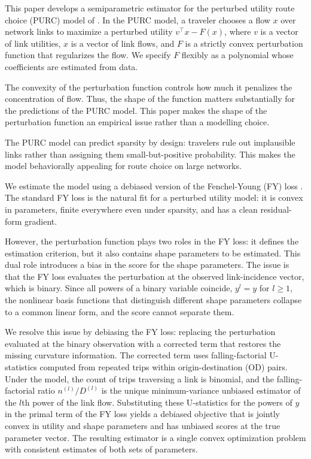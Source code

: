 \documentclass[12pt]{article}
\begin{document}
This paper develops a semiparametric estimator for the perturbed utility route choice (PURC) model of \citet{fosgerau2022perturbed, fosgerau2023bikeability}. In the PURC model, a traveler chooses a flow $x$ over network links to maximize a perturbed utility $v^\top x - F(x)$, where $v$ is a vector of link utilities, $x$ is a vector of link flows, and $F$ is a strictly convex perturbation function that regularizes the flow. We specify $F$ flexibly as a polynomial whose coefficients are estimated from data.

The convexity of the perturbation function controls how much it penalizes the concentration of flow. Thus, the shape of the function matters substantially for the predictions of the PURC model. This paper makes the shape of the perturbation function an empirical issue rather than a modelling choice. 


The PURC model can predict sparsity by design: travelers rule out implausible links rather than assigning them small-but-positive probability. This makes the model behaviorally appealing for route choice on large networks. 

We estimate the model using a debiased version of the Fenchel-Young (FY) loss \citep{blondel_learning_2020, lin_fenchel-young_2026}. The standard FY loss is the natural fit for a perturbed utility model: it is convex in parameters, finite everywhere even under sparsity, and has a clean residual-form gradient. 

However, the perturbation function plays two roles in the FY loss: it defines the estimation criterion, but it also contains shape parameters to be estimated. This dual role introduces a bias in the score for the shape parameters. The issue is that the FY loss evaluates the perturbation at the observed link-incidence vector, which is binary. Since all powers of a binary variable coincide, $y^l = y$ for $l \geq 1$, the nonlinear basis functions that distinguish different shape parameters collapse to a common linear form, and the score cannot separate them.

We resolve this issue by debiasing the FY loss: replacing the perturbation evaluated at the binary observation with a corrected term that restores the missing curvature information. The corrected term uses falling-factorial U-statistics computed from repeated trips within origin-destination (OD) pairs. Under the model, the count of trips traversing a link is binomial, and the falling-factorial ratio $n^{(l)}/D^{(l)}$ is the unique minimum-variance unbiased estimator of the $l$th power of the link flow. Substituting these U-statistics for the powers of $y$ in the primal term of the FY loss yields a debiased objective that is jointly convex in utility and shape parameters and has unbiased scores at the true parameter vector. The resulting estimator is a single convex optimization problem with consistent estimates of both sets of parameters.
\end{document}

